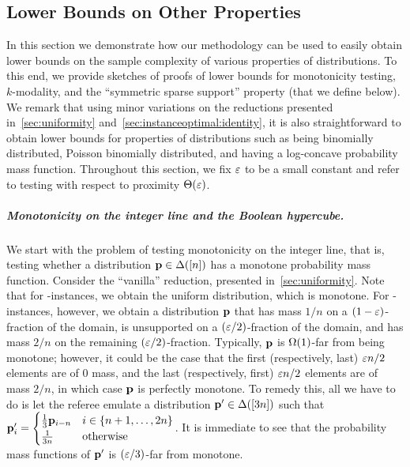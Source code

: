 \subsection{Lower Bounds on Other Properties}\label{sec:other}
In this section we demonstrate how our methodology can be used to easily obtain lower bounds on the sample complexity of various properties of distributions. To this end, we provide sketches of proofs of lower bounds for monotonicity testing, $k$-modality, and the ``symmetric sparse support'' property (that we define below). We remark that using minor variations on the reductions presented in~\cref{sec:uniformity} and~\cref{sec:instanceoptimal:identity}, it is also straightforward to obtain lower bounds for properties of distributions such as being binomially distributed, Poisson binomially distributed, and having a log-concave probability mass function. Throughout this section, we fix $\varepsilon$ to be a small constant and refer to testing with respect to proximity $\bigTheta{\eps}$.

\subparagraph{Monotonicity on the integer line and the Boolean hypercube.} We start with the problem of testing monotonicity on the integer line, that is, testing whether a distribution $\mathbf{p}\in\Delta\!\left([n]\right)$ has a monotone probability mass function. Consider the ``vanilla'' reduction, presented in~\cref{sec:uniformity}. Note that for \yes-instances, we obtain the uniform distribution, which is monotone. For \no-instances, however, we obtain a distribution $\mathbf{p}$ that has mass $1/n$ on a $(1-\varepsilon)$-fraction of the domain, is unsupported on a $(\varepsilon/2)$-fraction of the domain, and has mass $2/n$ on the remaining $(\varepsilon/2)$-fraction. Typically, $\mathbf{p}$ is $\bigOmega{1}$-far from being monotone; however, it could be the case that the first (respectively, last) $\varepsilon n / 2$ elements are of $0$ mass, and the last (respectively, first) $\varepsilon n / 2$ elements are of mass $2/n$, in which case $\mathbf{p}$ is perfectly monotone. To remedy this, all we have to do is let the referee emulate a distribution $\mathbf{p}'\in\Delta\!\left([3n]\right)$ such that 
$\mathbf{p}'_i = \begin{cases}
	\frac{1}{3}\mathbf{p}_{i-n} & i\in\{n+1, \ldots, 2n\} \\
	\frac{1}{3n} & \text{otherwise}
 \end{cases}$. It is immediate to see that the probability mass functions of $\mathbf{p}'$ is $(\varepsilon/3)$-far from monotone.
 
